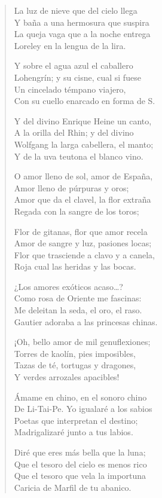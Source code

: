 \documentclass[12pt]{article}
\begin{document}
\begin{verse}
La luz de nieve que del cielo llega\\
Y baña a una hermosura que suspira\\
La queja vaga que a la noche entrega\\
Loreley en la lengua de la lira.  

Y sobre el agua azul el caballero\\
Lohengrín; y su cisne, cual si fuese\\
Un cincelado témpano viajero,\\
Con su cuello enarcado en forma de S.  

Y del divino Enrique Heine un canto,\\
A la orilla del Rhin; y del divino\\
Wolfgang la larga cabellera, el manto;\\
Y de la uva teutona el blanco vino.  

O amor lleno de sol, amor de España,\\
Amor lleno de púrpuras y oros;\\
Amor que da el clavel, la flor extraña\\
Regada con la sangre de los toros;  

Flor de gitanas, flor que amor recela\\
Amor de sangre y luz, pasiones locas;\\
Flor que trasciende a clavo y a canela,\\
Roja cual las heridas y las bocas.  

¿Los amores exóticos acaso…?\\
Como rosa de Oriente me fascinas:\\
Me deleitan la seda, el oro, el raso.\\
Gautier adoraba a las princesas chinas.  

¡Oh, bello amor de mil genuflexiones;\\
Torres de kaolín, pies imposibles,\\
Tazas de té, tortugas y dragones,\\
Y verdes arrozales apacibles!  

Ámame en chino, en el sonoro chino\\
De Li-Tai-Pe. Yo igualaré a los sabios\\
Poetas que interpretan el destino;\\
Madrigalizaré junto a tus labios.  

Diré que eres más bella que la luna;\\
Que el tesoro del cielo es menos rico\\
Que el tesoro que vela la importuna\\
Caricia de Marfil de tu abanico.  


\end{verse}
\end{document}
